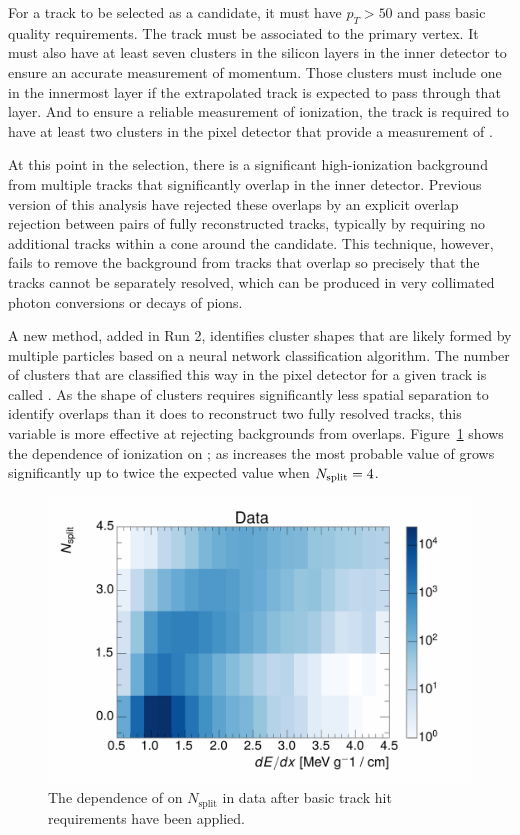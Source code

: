 For a track to be selected as a candidate, it must have $p_T > 50$ \GeV and pass basic quality requirements. 
The track must be associated to the primary vertex.
It must also have at least seven clusters in the silicon layers in the inner detector to ensure an accurate measurement of momentum.
Those clusters must include one in the innermost layer if the extrapolated track is expected to pass through that layer.
And to ensure a reliable measurement of ionization, the track is required to have at least two clusters in the pixel detector that provide a measurement of \dedx.

At this point in the selection, there is a significant high-ionization background from multiple tracks that significantly overlap in the inner detector. 
Previous version of this analysis have rejected these overlaps by an explicit overlap rejection between pairs of fully reconstructed tracks, typically by requiring no additional tracks within a cone around the candidate. 
This technique, however, fails to remove the background from tracks that overlap so precisely that the tracks cannot be separately resolved, which can be produced in very collimated photon conversions or decays of pions.

A new method, added in Run 2, identifies cluster shapes that are likely formed by multiple particles based on a neural network classification algorithm.
The number of clusters that are classified this way in the pixel detector for a given track is called \Nsplit.
As the shape of clusters requires significantly less spatial separation to identify overlaps than it does to reconstruct two fully resolved tracks, this variable is more effective at rejecting backgrounds from overlaps.
Figure~\ref{fig:dedx_nsplit} shows the dependence of ionization on \Nsplit; as \Nsplit increases the most probable value of \dedx grows significantly up to twice the expected value when $N_{\mathrm{split}} = 4$. 

\begin{figure}[h]
\centering
\includegraphics[width=\fullfig]{figures/dedx_nsplit_data.pdf}
\caption{The dependence of \dedx on $N_{\mathrm{split}}$ in data after basic track hit requirements have been applied.}
\label{fig:dedx_nsplit}
\end{figure}

